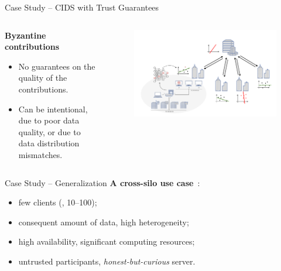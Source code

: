 \begin{frame}{Case Study -- CIDS with Trust Guarantees}
\begin{columns}
    \begin{column}{0.4\textwidth}
      \textbf{Byzantine contributions}
      \begin{itemize}
        \item No guarantees on the quality of the contributions.
        \item Can be intentional, due to poor data quality, or due to data distribution mismatches.
      \end{itemize}
    \end{column}
    
    \begin{column}{0.6\textwidth}
      \begin{figure}
        \centering
        \includegraphics[width=1.1\linewidth,center]{figures/intro/poisoning.drawio.pdf}
      \end{figure}
    \end{column}
  \end{columns}
\end{frame}

\begin{frame}{Case Study -- Generalization}
  \textbf{A cross-silo use case}~\cite{kairouz_AdvancesOpenProblems_2021}:
  \begin{itemize}
    \item few clients (\ie, 10--100);
    \item consequent amount of data, high heterogeneity;
    \item high availability, significant computing resources;
    \item untrusted participants, \emph{honest-but-curious} server.
  \end{itemize}
\end{frame}

